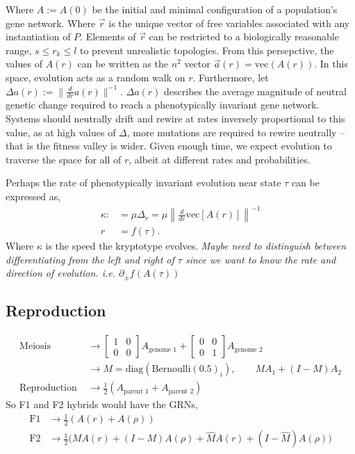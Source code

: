 \documentclass[11 pt]{article}
\newcommand{\jss}[1]{{\color{olive}\it #1}}
\newcommand{\1}{\mathbbm{1}}
\begin{document}
      Where $A := A(0)$ be the initial and minimal configuration of a population's gene network.
      Where $\vec{r}$ is the unique vector of free variables associated with any instantiation of $P$.
      Elements of $\vec{r}$  can be restricted to a biologically reasonable range, $s \leq r_{k} \leq l$ to prevent unrealistic topologies.
      From this persepctive, the values of $A(r)$ can be written as the $n^{2}$ vector $\vec{a}(r) = \text{vec}(A(r))$. In this space, evolution acts as a random walk on $r$. 
      Furthermore, let $\Delta a(r) := \lVert \frac{d}{dr} a(r) \rVert^{-1}$. $\Delta a(r)$ describes the average magnitude of neutral genetic change required to reach a phenotypically invariant gene network. Systems should neutrally drift and rewire at rates inversely proportional to this value, as at high values of $\Delta$, more mutations are required to rewire neutrally -- that is the fitness valley is wider. Given enough time, we expect evolution to traverse the space for all of $r$, albeit at different rates and probabilities.

      Perhaps the rate of phenotypically invariant evolution near state $\tau$ can be expressed as,
      \begin{align*}
        \kappa :&= \mu \Delta_{r} = \mu \left\lVert \frac{d}{d r} \text{vec}\left[A(r)\right] \right\rVert^{-1} \\
        r &= f(\tau). 
      \end{align*}
      Where $\kappa$ is the speed the kryptotype evolves.
      \jss{Maybe need to distinguish between differentiating from the left and right of $\tau$ since we want to know the rate and direction of evolution. i.e. $\partial_{\pm} f(A(\tau))$}

      \subsection{Reproduction}
      \begin{align*}
        \text{Meiosis } &\rightarrow \begin{bmatrix} 1 & 0 \\ 0 & 0 \end{bmatrix} A_{\text{genome }1} + \begin{bmatrix} 0 & 0 \\ 0 & 1 \end{bmatrix} A_{\text{genome }2} \\
          &\rightarrow M = \text{diag}(\text{Bernoulli}(0.5)_{i}), \qquad M A_{1} + (I-M)A_{2} \\
        \text{Reproduction } &\rightarrow \frac{1}{2}(A_{\text{parent }1} + A_{\text{parent }2})
      \end{align*}
      So F1 and F2 hybrids would have the GRNs,
      \begin{align*}
        \text{F}1 &\rightarrow \frac{1}{2}(A(r) + A(\rho)) \\
        \text{F}2 &\rightarrow \frac{1}{2} \big( M A(r) + ( I - M ) A(\rho) + \widehat{M} A(r) + ( I - \widehat{M} ) A(\rho) \big)
      \end{align*}
\end{document}
